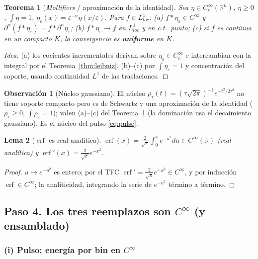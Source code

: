 \documentclass[11pt,a4paper]{article}
\theoremstyle{plain}
\newtheorem{theorem}{Teorema}
\newtheorem{lemma}[theorem]{Lema}
\theoremstyle{definition}
\newtheorem{remark}{Observaci\'on}
\newcommand{\R}{\mathbb{R}}
\newcommand{\erf}{\operatorname{erf}}
\begin{document}
\begin{theorem}[\emph{Mollifiers} / aproximaci\'on de la identidad]\label{thm:mollifier}
Sea $\eta\in C_c^\infty(\R^n)$, $\eta\ge0$, $\int\eta=1$,
$\eta_\varepsilon(x)=\varepsilon^{-n}\eta(x/\varepsilon)$. Para $f\in
L^1_{loc}$: (a) $f*\eta_\varepsilon\in C^\infty$ y
$\partial^\alpha(f*\eta_\varepsilon)=f*\partial^\alpha\eta_\varepsilon$;
(b) $f*\eta_\varepsilon\to f$ en $L^1_{loc}$ y en c.t.\ punto;
(c) si $f$ es continua en un compacto $K$, la convergencia es \textbf{uniforme}
en $K$.
\end{theorem}
\begin{proof}[Idea]
(a) los cocientes incrementales derivan sobre $\eta_\varepsilon\in C_c^\infty$ e
intercambian con la integral por el Teorema~\ref{thm:leibniz}. (b)--(c) por
$\int\eta_\varepsilon=1$ y concentraci\'on del soporte, usando continuidad $L^1$
de las traslaciones.
\end{proof}

\begin{remark}[N\'ucleo gaussiano]
El n\'ucleo $\rho_\tau(t)=(\tau\sqrt{2\pi})^{-1}e^{-t^2/2\tau^2}$ no tiene soporte
compacto pero es de Schwartz y una aproximaci\'on de la identidad
($\rho_\tau\ge0$, $\int\rho_\tau=1$); valen (a)--(c) del
Teorema~\ref{thm:mollifier} (la dominaci\'on usa el decaimiento gaussiano). Es el
n\'ucleo del pulso \eqref{eq:pulse}.
\end{remark}

\begin{lemma}[$\erf$ es real-anal\'itica]\label{lem:erf}
$\erf(x)=\frac{2}{\sqrt\pi}\int_0^x e^{-u^2}du\in C^\infty(\R)$ (real-anal\'itica)
y $\erf'(x)=\frac{2}{\sqrt\pi}e^{-x^2}$.
\end{lemma}
\begin{proof}
$u\mapsto e^{-u^2}$ es entero; por el TFC $\erf'=\frac{2}{\sqrt\pi}e^{-x^2}\in
C^\infty$, y por inducci\'on $\erf\in C^\infty$; la analiticidad, integrando la
serie de $e^{-u^2}$ t\'ermino a t\'ermino.
\end{proof}

\subsection*{Paso 4. Los tres reemplazos son $C^\infty$ (y ensamblado)}
\label{sec:construccion-just}

\subsubsection*{(i) Pulso: energ\'ia por bin en $C^\infty$}
\end{document}
